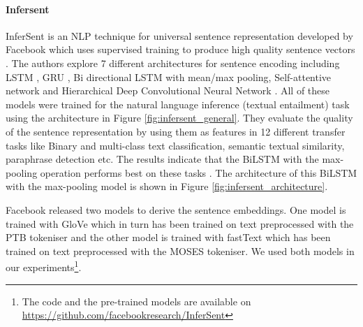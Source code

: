 \paragraph{Infersent}
InferSent is an NLP technique for universal sentence representation developed by Facebook which uses supervised training to produce high quality sentence vectors \cite{conneau-EtAl:2017:EMNLP2017}. The authors explore 7 different architectures for sentence
encoding including LSTM \cite{10.1162/neco.1997.9.8.1735}, GRU \cite{Chung2014EmpiricalEO}, Bi directional LSTM \cite{650093} with mean/max pooling, Self-attentive network and Hierarchical Deep Convolutional Neural Network \cite{conneau-EtAl:2017:EMNLP2017}. All of these models were trained for the natural language inference (textual entailment) task using the architecture in Figure \ref{fig:infersent_general}. They evaluate the quality of the sentence representation by using them as features in 12 different transfer tasks like Binary and multi-class text classification, semantic textual similarity, paraphrase detection etc. The results indicate that the BiLSTM with the max-pooling operation performs best on these tasks  \cite{conneau-EtAl:2017:EMNLP2017}. The architecture of this BiLSTM with the max-pooling model is shown in Figure \ref{fig:infersent_architecture}.

Facebook released two models to derive the sentence embeddings. One model is trained with GloVe \cite{pennington-etal-2014-glove} which in turn has been trained on text preprocessed with the PTB tokeniser and the other model is trained with fastText \cite{mikolov-etal-2018-advances}  which has been trained on text preprocessed with the MOSES tokeniser. We used both models in our experiments\footnote{The code and the pre-trained models are available on \url{https://github.com/facebookresearch/InferSent}}.



